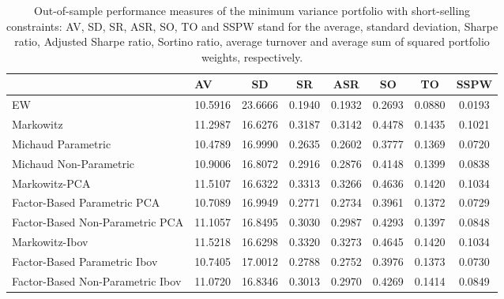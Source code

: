 \begin{table}

\caption{\label{tab:empirical_mvp}Out-of-sample performance measures of the minimum variance portfolio with short-selling constraints: AV, SD, SR, ASR, SO, TO and SSPW stand for the average, standard deviation, Sharpe ratio, Adjusted Sharpe ratio, Sortino ratio, average turnover and average sum of squared portfolio weights, respectively.}
\centering
\begin{tabular}[t]{l|l|c|c|c|c|c|c}
\hline
  & AV & SD & SR & ASR & SO & TO & SSPW\\
\hline
EW & 10.5916 & 23.6666 & 0.1940 & 0.1932 & 0.2693 & 0.0880 & 0.0193\\
\hline
Markowitz & 11.2987 & 16.6276 & 0.3187 & 0.3142 & 0.4478 & 0.1435 & 0.1021\\
\hline
Michaud Parametric & 10.4789 & 16.9990 & 0.2635 & 0.2602 & 0.3777 & 0.1369 & 0.0720\\
\hline
Michaud Non-Parametric & 10.9006 & 16.8072 & 0.2916 & 0.2876 & 0.4148 & 0.1399 & 0.0838\\
\hline
Markowitz-PCA & 11.5107 & 16.6322 & 0.3313 & 0.3266 & 0.4636 & 0.1420 & 0.1034\\
\hline
Factor-Based Parametric PCA & 10.7089 & 16.9949 & 0.2771 & 0.2734 & 0.3961 & 0.1372 & 0.0729\\
\hline
Factor-Based Non-Parametric PCA & 11.1057 & 16.8495 & 0.3030 & 0.2987 & 0.4293 & 0.1397 & 0.0848\\
\hline
Markowitz-Ibov & 11.5218 & 16.6298 & 0.3320 & 0.3273 & 0.4645 & 0.1420 & 0.1034\\
\hline
Factor-Based Parametric Ibov & 10.7405 & 17.0012 & 0.2788 & 0.2752 & 0.3976 & 0.1373 & 0.0730\\
\hline
Factor-Based Non-Parametric Ibov & 11.0720 & 16.8346 & 0.3013 & 0.2970 & 0.4269 & 0.1414 & 0.0849\\
\hline
\end{tabular}
\end{table}
